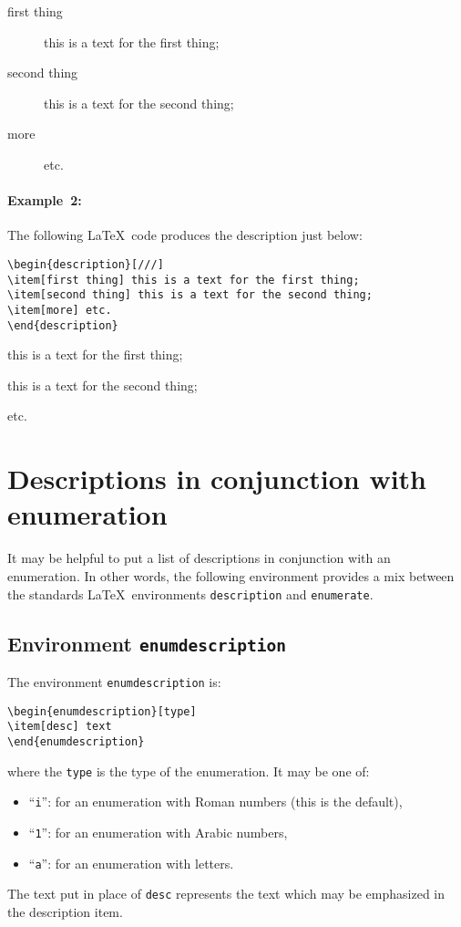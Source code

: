 \documentclass[book,taskpackage,specpackage,codepackage]{upmethodology-document}
\begin{document}
\begin{description}
\item[first thing] this is a text for the first thing;
\item[second thing] this is a text for the second thing;
\item[more] etc.
\end{description}

\paragraph{Example~2:} The following \LaTeX~code produces the description just below:
\begin{verbatim}
\begin{description}[///]
\item[first thing] this is a text for the first thing;
\item[second thing] this is a text for the second thing;
\item[more] etc.
\end{description}
\end{verbatim}

\begin{description}[///]
\item[first thing] this is a text for the first thing;
\item[second thing] this is a text for the second thing;
\item[more] etc.
\end{description}

\section{Descriptions in conjunction with enumeration}

It may be helpful to put a list of descriptions in conjunction with an enumeration.
In other words, the following environment provides a mix between the standards \LaTeX~environments \texttt{description} and \texttt{enumerate}.

\subsection{Environment \texttt{enumdescription}}

The environment \texttt{enumdescription} is:
\begin{verbatim}
\begin{enumdescription}[type]
\item[desc] text
\end{enumdescription}
\end{verbatim}
where the \texttt{type} is the type of the enumeration. It may be one of:
\begin{itemize}
\item ``\texttt{i}'': for an enumeration with Roman numbers (this is the default),
\item ``\texttt{1}'': for an enumeration with Arabic numbers,
\item ``\texttt{a}'': for an enumeration with letters.
\end{itemize}
The text put in place of \texttt{desc} represents the text which may be emphasized in the description item.
\end{document}
